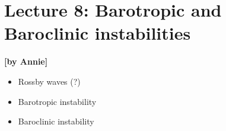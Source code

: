 
\section{Lecture 8: Barotropic and Baroclinic instabilities}\label{sec:lecture8}
\begin{flushright}\textbf{[by Annie]}\end{flushright}
  
 \begin{itemize}
   \item
   Rossby waves (?)
   \item
   Barotropic instability
   \item
   Baroclinic instability
 \end{itemize}
